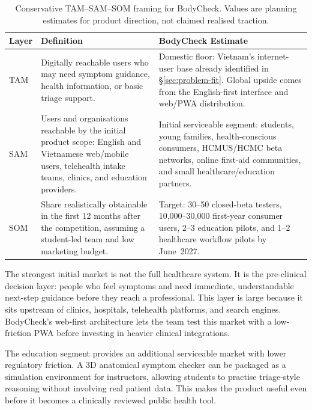 \begin{table}[htbp]
  \centering
  \caption{Conservative TAM--SAM--SOM framing for BodyCheck. Values are
    planning estimates for product direction, not claimed realised traction.}
  \label{tab:tam_sam_som}
  \setlength{\tabcolsep}{5pt}
  \renewcommand{\arraystretch}{1.45}
  \small
  \begin{tabular}{@{} p{2.0cm} p{5.2cm} p{5.1cm} @{}}
    \toprule
    \textbf{Layer} & \textbf{Definition} & \textbf{BodyCheck Estimate} \\
    \midrule

    TAM &
    Digitally reachable users who may need symptom guidance, health
    information, or basic triage support. &
    Domestic floor: Vietnam's internet-user base already identified in
    \S\ref{sec:problem-fit}. Global upside comes from the English-first
    interface and web/PWA distribution. \\

    SAM &
    Users and organisations reachable by the initial product scope: English
    and Vietnamese web/mobile users, telehealth intake teams, clinics, and
    education providers. &
    Initial serviceable segment: students, young families, health-conscious
    consumers, HCMUS/HCMC beta networks, online first-aid communities, and
    small healthcare/education partners. \\

    SOM &
    Share realistically obtainable in the first 12 months after the
    competition, assuming a student-led team and low marketing budget. &
    Target: 30--50 closed-beta testers, 10{,}000--30{,}000 first-year
    consumer users, 2--3 education pilots, and 1--2 healthcare workflow
    pilots by June~2027. \\

    \bottomrule
  \end{tabular}
\end{table}

The strongest initial market is not the full healthcare system. It is the
pre-clinical decision layer: people who feel symptoms and need immediate,
understandable next-step guidance before they reach a professional. This layer
is large because it sits upstream of clinics, hospitals, telehealth platforms,
and search engines. BodyCheck's web-first architecture lets the team test this
market with a low-friction PWA before investing in heavier clinical
integrations.

The education segment provides an additional serviceable market with lower
regulatory friction. A 3D anatomical symptom checker can be packaged as a
simulation environment for instructors, allowing students to practise
triage-style reasoning without involving real patient data. This makes the
product useful even before it becomes a clinically reviewed public health tool.

